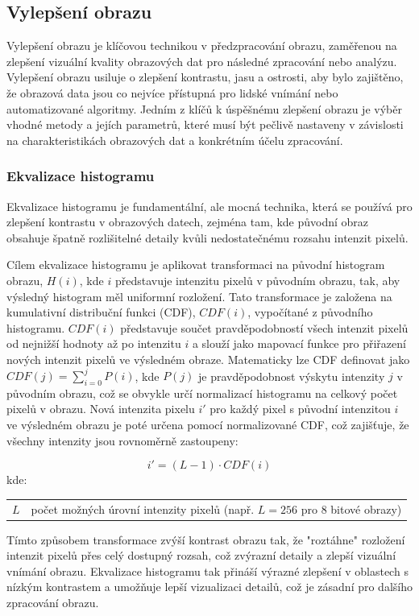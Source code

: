 \documentclass[male,czech,api_ing]{thesis}
\makeatletter
\newenvironment{conditions}[1][kde:]
    {#1 \begin{tabular}[t]{>{$}l<{$} @{${}={}$} >{\raggedright\arraybackslash}p{10cm}}}
    {\end{tabular}}
\makeatother
\begin{document}
\subsection{Vylepšení obrazu}
Vylepšení obrazu je klíčovou technikou v předzpracování obrazu, zaměřenou na zlepšení vizuální kvality obrazových dat pro následné zpracování nebo analýzu. Vylepšení obrazu usiluje o zlepšení kontrastu, jasu a ostrosti, aby bylo zajištěno, že obrazová data jsou co nejvíce přístupná pro lidské vnímání nebo automatizované algoritmy. 
Jedním z klíčů k úspěšnému zlepšení obrazu je výběr vhodné metody a jejích parametrů, které musí být pečlivě nastaveny v závislosti na charakteristikách obrazových dat a konkrétním účelu zpracování. 

\subsubsection{Ekvalizace histogramu}
Ekvalizace histogramu je fundamentální, ale mocná technika, která se používá pro zlepšení kontrastu v obrazových datech, zejména tam, kde původní obraz obsahuje špatně rozlišitelné detaily kvůli nedostatečnému rozsahu intenzit pixelů.

Cílem ekvalizace histogramu je aplikovat transformaci na původní histogram obrazu, $H(i)$, kde $i$ představuje intenzitu pixelů v původním obrazu, tak, aby výsledný histogram měl uniformní rozložení. Tato transformace je založena na kumulativní distribuční funkci (CDF), $CDF(i)$, vypočítané z původního histogramu. $CDF(i)$ představuje součet pravděpodobností všech intenzit pixelů od nejnižší hodnoty až po intenzitu $i$ a slouží jako mapovací funkce pro přiřazení nových intenzit pixelů ve výsledném obraze. Matematicky lze CDF definovat jako $CDF(j) = \sum_{i=0}^{j} P(i)$, kde $P(j)$ je pravděpodobnost výskytu intenzity $j$ v původním obrazu, což se obvykle určí normalizací histogramu na celkový počet pixelů v obrazu. Nová intenzita pixelu $i'$ pro každý pixel s původní intenzitou $i$ ve výsledném obrazu je poté určena pomocí normalizované CDF, což zajišťuje, že všechny intenzity jsou rovnoměrně zastoupeny:

\begin{equation}
    i' = (L-1) \cdot CDF(i)
\end{equation}
\begin{conditions}
    L & počet možných úrovní intenzity pixelů (např. $L = 256$ pro 8 bitové obrazy)
\end{conditions}

Tímto způsobem transformace zvýší kontrast obrazu tak, že "roztáhne" rozložení intenzit pixelů přes celý dostupný rozsah, což zvýrazní detaily a zlepší vizuální vnímání obrazu. Ekvalizace histogramu tak přináší výrazné zlepšení v oblastech s nízkým kontrastem a umožňuje lepší vizualizaci detailů, což je zásadní pro dalšího zpracování obrazu. \cite{ComputerVisionMetrics} \cite{ComputerVisionForX-RayTesting}
\end{document}
